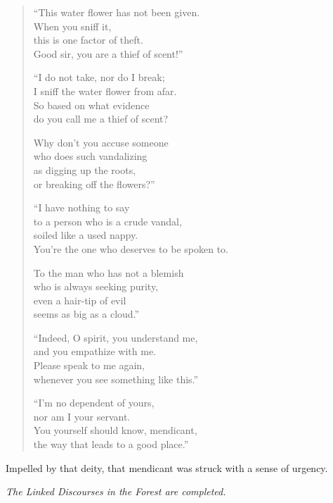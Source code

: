 \documentclass[12pt,openany]{book}%
\let\oldcontentsline\contentsline
\newcommand{\nopagecontentsline}[3]{\oldcontentsline{#1}{#2}{}}
\newcommand*{\scendsutta}[1]{\begin{center}\textit{#1}\end{center}}
\begin{document}
\begin{verse}%
“This water flower has not been given. \\
When you sniff it, \\
this is one factor of theft. \\
Good sir, you are a thief of scent!” 

“I do not take, nor do I break; \\
I sniff the water flower from afar. \\
So based on what evidence \\
do you call me a thief of scent? 

Why don’t you accuse someone \\
who does such vandalizing \\
as digging up the roots, \\
or breaking off the flowers?” 

“I have nothing to say \\
to a person who is a crude vandal, \\
soiled like a used nappy. \\
You’re the one who deserves to be spoken to. 

To the man who has not a blemish \\
who is always seeking purity, \\
even a hair-tip of evil \\
seems as big as a cloud.” 

“Indeed, O spirit, you understand me, \\
and you empathize with me. \\
Please speak to me again, \\
whenever you see something like this.” 

“I’m no dependent of yours, \\
nor am I your servant. \\
You yourself should know, mendicant, \\
the way that leads to a good place.” 

%
\end{verse}

Impelled by that deity, that mendicant was struck with a sense of urgency. 

\scendsutta{The Linked Discourses in the Forest are completed. }

%
\end{document}
